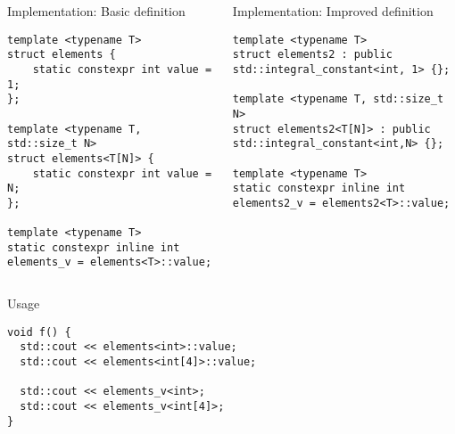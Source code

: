 \begin{frame}[t,fragile]

\begin{columns}[T]

\begin{block}{Implementation: Basic definition}
\begin{lstlisting}[basicstyle=\mode<presentation>{\tiny}]
template <typename T>
struct elements {
    static constexpr int value = 1;
};

template <typename T, std::size_t N>
struct elements<T[N]> {
    static constexpr int value = N;
};

template <typename T>
static constexpr inline int elements_v = elements<T>::value;
\end{lstlisting}
\end{block}

\pause
{}
\begin{block}{Implementation: Improved definition}
\begin{lstlisting}[basicstyle=\mode<presentation>{\tiny}]
template <typename T>
struct elements2 : public std::integral_constant<int, 1> {};

template <typename T, std::size_t N>
struct elements2<T[N]> : public std::integral_constant<int,N> {};

template <typename T>
static constexpr inline int elements2_v = elements2<T>::value;

\end{lstlisting}
\end{block}

\end{columns}

\pause
\begin{block}{Usage}
\begin{lstlisting}[basicstyle=\mode<presentation>{\tiny}]
void f() {
  std::cout << elements<int>::value;
  std::cout << elements<int[4]>::value;

  std::cout << elements_v<int>;
  std::cout << elements_v<int[4]>;
}
\end{lstlisting}
\end{block}

\end{frame}

